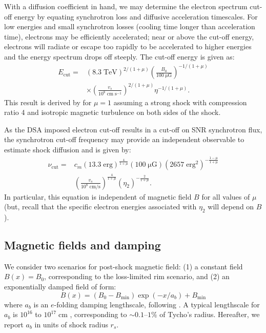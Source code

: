 \documentclass[manuscript]{aastex}  %
\newcommand*{\mt}{\mathrm}
\newcommand*{\unit}[1]{\;\mt{#1}}  %
\newcommand*{\abt}{\mathord{\sim}} %
\newcommand*{\Ecut}{E_{\mt{cut}}}
\newcommand*{\Bmin}{B_{\mt{min}}}
\newcommand*{\muG}{\unit{\mu G}}
\begin{document}
With a diffusion coefficient in hand, we may determine the electron spectrum
cut-off energy by equating synchrotron loss and diffusive acceleration
timescales.  For low energies and small synchrotron losses (cooling time longer
than acceleration time), electrons may be efficiently accelerated; near or
above the cut-off energy, electrons will radiate or escape too rapidly to be
accelerated to higher energies and the energy spectrum drops off steeply.  The
cut-off energy is given as:
\begin{align} \label{eq:ecut}
    \Ecut =
        &\left(8.3\unit{TeV}\right)^{2/(1+\mu)}
        \left(\frac{B_0}{100 \muG}\right)^{-1/(1+\mu)} \nonumber \\
        &\times \left(\frac{v_s}{10^8 \unit{cm\;s^{-1}}}\right)^{2/(1+\mu)}
        \eta^{-1 / (1+\mu)} .
\end{align}
This result is derived by \citet{parizot2006} for $\mu=1$ assuming a strong
shock with compression ratio 4 and isotropic magnetic turbulence on both sides
of the shock.

As the DSA imposed electron cut-off results in a cut-off on SNR synchrotron
flux, the synchrotron cut-off frequency may provide an independent observable
to estimate shock diffusion and is given by:
\begin{align} \label{eq:cutoff}
    \nu_{\mt{cut}} =
        &c_m \left(13.3 \unit{erg}\right)^{\frac{4}{1+\mu}}
        \left(100 \muG\right)
        \left(2657 \unit{erg^2}\right)^{-\frac{1-\mu}{1+\mu}} \nonumber \\
        &\left( \frac{v_s}{10^8 \unit{cm/s}} \right)^{\frac{4}{1+\mu}}
        \left( \eta_2 \right)^{-\frac{2}{1+\mu}} .
\end{align}
In particular, this equation is independent of magnetic field $B$ for all
values of $\mu$ (but, recall that the specific electron energies associated
with $\eta_2$ will depend on $B$).

\subsection{Magnetic fields and damping}

We consider two scenarios for post-shock magnetic field: (1) a constant field
$B(x) = B_0$, corresponding to the loss-limited rim scenario, and (2) an
exponentially damped field of form:
\begin{equation} \label{eq:bdamp}
    B(x) = \left(B_0 - \Bmin\right) \exp\left(-x / a_b\right)
           + \Bmin
\end{equation}
where $a_b$ is an $e$-folding damping lengthscale, following \citet{pohl2005}.
A typical lengthscale for $a_b$ is $10^{16}$ to $10^{17} \unit{cm}$
\citep{pohl2005}, corresponding to $\abt 0.1$--$1\%$ of Tycho's radius.
Hereafter, we report $a_b$ in units of shock radius $r_s$.
\end{document}
